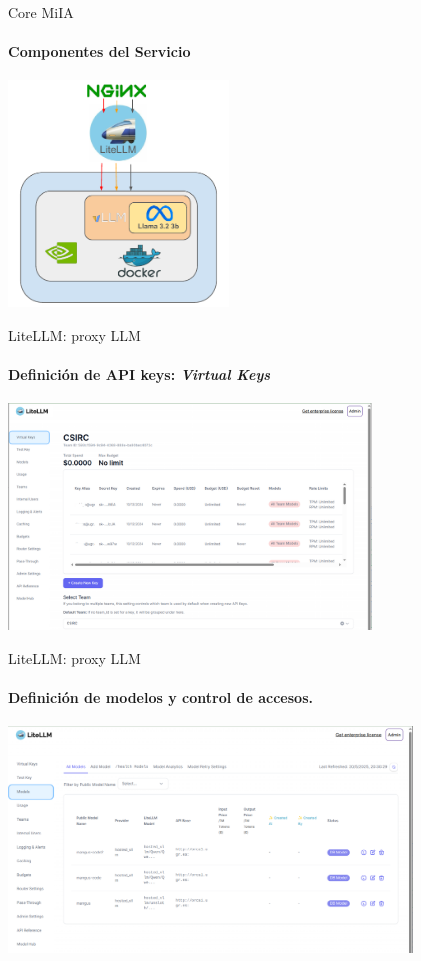 \documentclass[aspectratio=169]{beamer}
\begin{document}
\begin{frame}{Core MiIA}
    \framesubtitle{Componentes del Servicio}

    \begin{center}
        \includegraphics[height=6cm]{imagenes/MiIA_core.pdf}
    \end{center}


\end{frame}

\begin{frame}{LiteLLM: proxy LLM}
    \framesubtitle{Definición de API keys: \textit{Virtual Keys}}

    \begin{center}
        \includegraphics[height=6cm]{imagenes/LiteLLM_vkeys.png}
    \end{center}

\end{frame}

\begin{frame}{LiteLLM: proxy LLM}
    \framesubtitle{Definición de modelos y control de accesos.}

    \begin{center}
        \includegraphics[height=6cm]{imagenes/LiteLLM_models.png}
    \end{center}

\end{frame}
\end{document}
